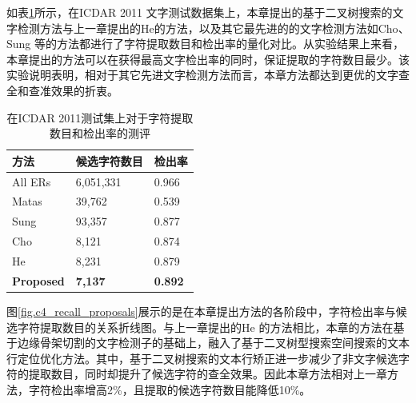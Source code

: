         如表\ref{tab.c4_icdar11}所示，在ICDAR 2011 文字测试数据集上，本章提出的基于二叉树搜索的文字检测方法与上一章提出的He\cite{He2017scene}的方法，以及其它最先进的的文字检测方法如Cho\cite{Cho2016Canny}、Sung\cite{Sung2015Scene} 等的方法都进行了字符提取数目和检出率的量化对比。从实验结果上来看，本章提出的方法可以在获得最高文字检出率的同时，保证提取的字符数目最少。该实验说明表明，相对于其它先进文字检测方法而言，本章方法都达到更优的文字查全和查准效果的折衷。

        \begin{table}[!h]
        \centering
        \caption{在ICDAR 2011测试集上对于字符提取数目和检出率的测评}
        \begin{tabular}{p{}|p{} p{}}
        \hline
        方法 & 候选字符数目 & 检出率 \\
        \hline
        All ERs & 6,051,331 & 0.966 \\
        Matas\cite{Matas2004Robust} & 39,762 & 0.539 \\
        Sung\cite{Sung2015Scene} & 93,357 & 0.877  \\
        Cho\cite{Cho2016Canny} & 8,121 & 0.874 \\
        He\cite{He2017scene} & 8,231 & 0.879 \\
        \hline
        \textbf{Proposed} & \textbf{7,137} & \textbf{0.892} \\
        \hline
        \end{tabular}
        \label{tab.c4_icdar11}
        \end{table}

        图\ref{fig.c4_recall_proposals}展示的是在本章提出方法的各阶段中，字符检出率与候选字符提取数目的关系折线图。与上一章提出的He\cite{He2017scene} 的方法相比，本章的方法在基于边缘骨架切割的文字检测子的基础上，融入了基于二叉树型搜索空间搜索的文本行定位优化方法。其中，基于二叉树搜索的文本行矫正进一步减少了非文字候选字符的提取数目，同时却提升了候选字符的查全效果。因此本章方法相对上一章方法，字符检出率增高2\%，且提取的候选字符数目能降低10\%。

